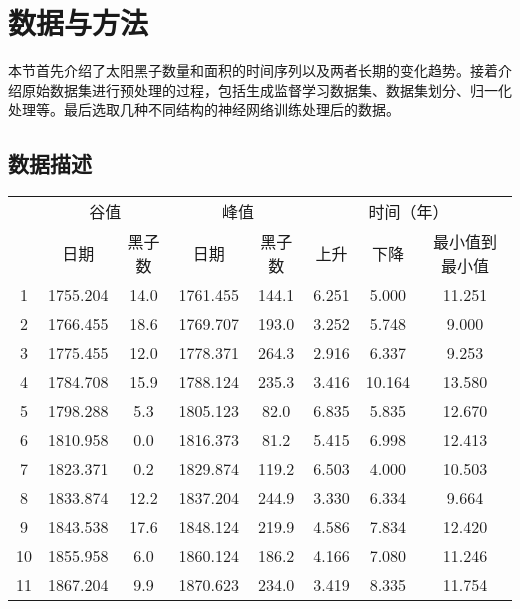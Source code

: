 \section{数据与方法}\label{sec:ss_data_method}

本节首先介绍了太阳黑子数量和面积的时间序列以及两者长期的变化趋势。接着介绍原始数据集进行预处理的过程，包括生成监督学习数据集、数据集划分、归一化处理等。最后选取几种不同结构的神经网络训练处理后的数据。

\subsection{数据描述}\label{sec:ss_dataset}

\begin{table}[!htbp]
  \centering
  \label{tab:ss_max_min}
  \footnotesize
  \begin{tabular}{cccccccc}
    \toprule
    \multicolumn{1}{c}{}&\multicolumn{2}{c}{谷值}&
    \multicolumn{2}{c}{峰值}& \multicolumn{3}{c}{时间（年）}\\
    \cmidrule(lr){2-3} \cmidrule(lr){4-5} \cmidrule(lr){6-8} \noalign{\smallskip}
    \multicolumn{1}{c}{太阳周} & 日期 & 黑子数 & 日期 & 黑子数 & 上升 & 下降 & 最小值到最小值\\ 
    \midrule 
    1 & 1755.204 & 14.0 & 1761.455 & 144.1 & 6.251 & 5.000 & 11.251 \\
    2 & 1766.455 & 18.6 & 1769.707 & 193.0 & 3.252 & 5.748 & 9.000 \\
    3 & 1775.455 & 12.0 & 1778.371 & 264.3 & 2.916 & 6.337 & 9.253 \\
    4 & 1784.708 & 15.9 & 1788.124 & 235.3 & 3.416 & 10.164 & 13.580 \\
    5 & 1798.288 & 5.3 & 1805.123 & 82.0 & 6.835 & 5.835 & 12.670 \\
    6 & 1810.958 & 0.0 & 1816.373 & 81.2 & 5.415 & 6.998 & 12.413 \\
    7 & 1823.371 & 0.2 & 1829.874 & 119.2 & 6.503 & 4.000 & 10.503 \\
    8 & 1833.874 & 12.2 & 1837.204 & 244.9 & 3.330 & 6.334 & 9.664 \\
    9 & 1843.538 & 17.6 & 1848.124 & 219.9 & 4.586 & 7.834 & 12.420 \\
    10 & 1855.958 & 6.0 & 1860.124 & 186.2 & 4.166 & 7.080 & 11.246 \\
    11 & 1867.204 & 9.9 & 1870.623 & 234.0 & 3.419 & 8.335 & 11.754 \\

\end{tabular}
\end{table}
